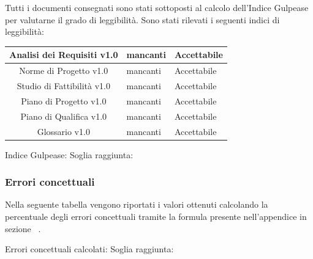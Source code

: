 Tutti i documenti consegnati sono stati sottoposti al calcolo dell'Indice Gulpease per valutarne il grado di leggibilità.
Sono stati rilevati i seguenti indici di leggibilità:

{
	\renewcommand{\arraystretch}{2}
	\centering
	\begin{tabular}{| c | C{3cm} | C{3cm} |}
			\hline
		Analisi dei Requisiti v1.0 &  mancanti & Accettabile \\
			\hline
		Norme di Progetto v1.0 & mancanti & Accettabile\\
			\hline
		Studio di Fattibilità v1.0 & mancanti & Accettabile\\ 
			\hline
		Piano di Progetto v1.0 & mancanti & Accettabile \\
			\hline
		Piano di Qualifica v1.0 & mancanti & Accettabile\\
			\hline
		Glossario v1.0 & mancanti & Accettabile\\
			\hline
	 \end{tabular}
 
}

Indice Gulpease:
Soglia raggiunta:

\subsubsection{Errori concettuali}

Nella seguente tabella vengono riportati i valori ottenuti calcolando la percentuale degli errori concettuali tramite la formula presente nell'appendice in sezione ~.


Errori concettuali calcolati:
Soglia raggiunta:
